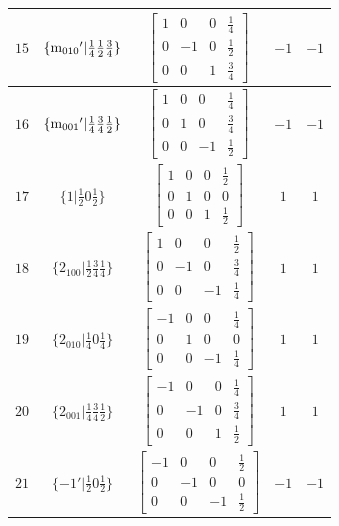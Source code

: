 \documentclass[fleqn,8pt]{jsarticle}
\begin{document}
\begin{longtable}{ccccc}
$ 15 $ & $ \{{\rm m}_{010}{}'|\frac{1}{4} \frac{1}{2} \frac{3}{4}\} $ & $ \begin{bmatrix} 1 & 0 & 0 & \frac{1}{4} \\ 0 & -1 & 0 & \frac{1}{2} \\ 0 & 0 & 1 & \frac{3}{4} \end{bmatrix} $ & $ -1 $ & $ -1 $ \\ \hline
$ 16 $ & $ \{{\rm m}_{001}{}'|\frac{1}{4} \frac{3}{4} \frac{1}{2}\} $ & $ \begin{bmatrix} 1 & 0 & 0 & \frac{1}{4} \\ 0 & 1 & 0 & \frac{3}{4} \\ 0 & 0 & -1 & \frac{1}{2} \end{bmatrix} $ & $ -1 $ & $ -1 $ \\ \hline
$ 17 $ & $ \{1|\frac{1}{2} 0 \frac{1}{2}\} $ & $ \begin{bmatrix} 1 & 0 & 0 & \frac{1}{2} \\ 0 & 1 & 0 & 0 \\ 0 & 0 & 1 & \frac{1}{2} \end{bmatrix} $ & $ 1 $ & $ 1 $ \\ \hline
$ 18 $ & $ \{2{}_{100}|\frac{1}{2} \frac{3}{4} \frac{1}{4}\} $ & $ \begin{bmatrix} 1 & 0 & 0 & \frac{1}{2} \\ 0 & -1 & 0 & \frac{3}{4} \\ 0 & 0 & -1 & \frac{1}{4} \end{bmatrix} $ & $ 1 $ & $ 1 $ \\ \hline
$ 19 $ & $ \{2{}_{010}|\frac{1}{4} 0 \frac{1}{4}\} $ & $ \begin{bmatrix} -1 & 0 & 0 & \frac{1}{4} \\ 0 & 1 & 0 & 0 \\ 0 & 0 & -1 & \frac{1}{4} \end{bmatrix} $ & $ 1 $ & $ 1 $ \\ \hline
$ 20 $ & $ \{2{}_{001}|\frac{1}{4} \frac{3}{4} \frac{1}{2}\} $ & $ \begin{bmatrix} -1 & 0 & 0 & \frac{1}{4} \\ 0 & -1 & 0 & \frac{3}{4} \\ 0 & 0 & 1 & \frac{1}{2} \end{bmatrix} $ & $ 1 $ & $ 1 $ \\ \hline
$ 21 $ & $ \{-1{}'|\frac{1}{2} 0 \frac{1}{2}\} $ & $ \begin{bmatrix} -1 & 0 & 0 & \frac{1}{2} \\ 0 & -1 & 0 & 0 \\ 0 & 0 & -1 & \frac{1}{2} \end{bmatrix} $ & $ -1 $ & $ -1 $ \\ \hline

\end{longtable}
\end{document}
